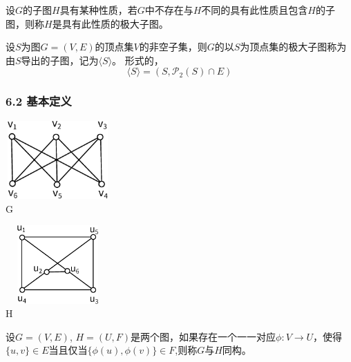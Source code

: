 \documentclass{beamer}
\begin{document}
\begin{CJK*}{UTF8}{gbsn}
\begin{frame}
    \pause
  \begin{definition6.2.8}
    设$G$的子图$H$具有某种性质，若$G$中不存在与$H$不同的具有此性质且包含$H$的子图，则称$H$是具有此性质的\alert{极大子图}。
  \end{definition6.2.8}
\pause
  \begin{definition6.2.9}
    设$S$为图$G=(V,E)$的顶点集$V$的非空子集，则$G$的以$S$为顶点集的极大子图称为由$S$导出的子图，记为$\langle S \rangle$。
形式的，
\begin{equation*}
  \langle S \rangle=(S, \mathcal{P}_2(S) \cap E)
\end{equation*}
  \end{definition6.2.9}
\end{frame}
\begin{frame}
  \frametitle{6.2 基本定义}
    \begin{minipage}[c]{0.4\textwidth}
\includegraphics[width=4cm,height=3cm]{k33} \\ \centering G 
    \end{minipage}\hspace{2cm}
    \begin{minipage}[c]{0.4\textwidth}
\includegraphics[width=4cm,height=3cm]{isomorphic} \\ \centering H 
    \end{minipage}
    \pause
  \begin{definition6.2.10}
    设$G=(V,E)$, $H = (U, F)$是两个图，如果存在一个一一对应$\phi:V \to
    U$，使得$\{u,v\} \in E$当且仅当$\{\phi(u),\phi(v)\} \in F$,则称$G$与$H$\alert{同构}。
  \end{definition6.2.10}
\end{frame}


\end{CJK*}
\end{document}
